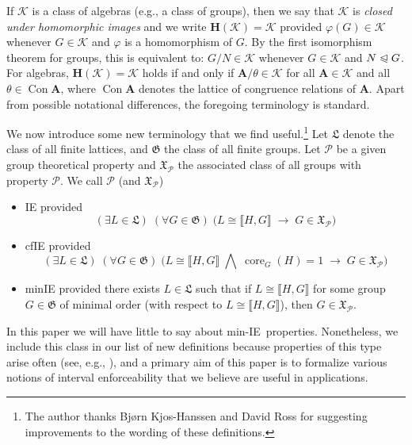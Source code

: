 \documentclass{gen-j-l}
\newcommand{\lb}{\ensuremath{\llbracket}}
\newcommand{\rb}{\ensuremath{\rrbracket}}
\newcommand{\<}{\ensuremath{\langle}}
\renewcommand{\>}{\ensuremath{\rangle}}
\theoremstyle{plain}
\theoremstyle{definition}
\theoremstyle{remark}
\numberwithin{theorem}{section}
\numberwithin{claim}{section}
\numberwithin{equation}{section}
\numberwithin{conjecture}{section}
\newcommand{\subnormal}{\ensuremath{\trianglelefteqslant}}
\newcommand{\Meet}{\ensuremath{\bigwedge}}
\newcommand{\Con}{\ensuremath{\operatorname{Con}}}
\newcommand{\core}{\ensuremath{\operatorname{core}}}
\newcommand{\2}{\ensuremath{\mathbf{2}}}
\newcommand{\3}{\ensuremath{\mathbf{3}}}
\newcommand{\bA}{\ensuremath{\mathbf{A}}}
\newcommand{\sG}{\ensuremath{\mathfrak{X}}}
\newcommand{\G}{\ensuremath{\mathfrak{G}}}
\newcommand{\bH}{\ensuremath{\mathbf{H}}}
\newcommand{\sK}{\ensuremath{\mathscr{K}}}
\newcommand{\fL}{\ensuremath{\mathfrak{L}}}
\newcommand{\cP}{\ensuremath{\mathcal{P}}}
\newcommand{\IE}{{\small IE}}
\renewcommand{\phi}{\ensuremath{\varphi}}
\begin{document}
If $\sK$ is a class of algebras (e.g., a class of groups), then we say that
$\sK$ is \emph{closed under homomorphic images} and we write $\bH(\sK) = \sK$
provided $\phi(G)\in \sK$ whenever $G\in \sK$ and $\phi$ is a homomorphism of
$G$. By the first isomorphism theorem for
  groups, this is equivalent to: 
$G/N\in \sK$ whenever $G\in \sK$ and $N\subnormal G$.  For algebras, 
$\bH(\sK) = \sK$ holds if and only if $\bA/\theta \in \sK$ for all $\bA\in \sK$
  and all $\theta \in \Con\bA$, where $\Con\bA$ denotes the lattice of
  congruence relations of $\bA$. 
Apart from possible notational differences, the foregoing terminology is
standard.  

We now introduce some new terminology that we find
useful.\footnote{The author thanks Bj{\o}rn Kjos-Hanssen and David Ross for suggesting
  improvements to the wording of these definitions.}  Let $\fL$
denote the class of all finite lattices, and $\G$ the class of all 
finite groups. Let $\cP$ be a given group theoretical property and $\sG_\cP$
the associated class of all groups with property $\cP$.  
We call $\cP$ (and $\sG_\cP$)
\begin{itemize}
\item 
\acf{IE} provided
\[
(\exists L\in \fL)  \; (\forall G \in \G) \; \bigl(L\cong \lb H,G \rb \; \longrightarrow \; G
\in \sG_\cP\bigr)
\]
\item
\acf{cfIE} provided
\[
(\exists L\in \fL)  \; (\forall G\in \G) \; \bigl( L\cong \lb H,G \rb \; \Meet \; \core_G(H)=1
\; \longrightarrow \; G  \in \sG_\cP \bigr)
\]
\item 
\acf{minIE}
provided there exists $L\in \fL$ such that if $L\cong \lb H,G \rb$ for some
group $G\in \G$ of minimal order (with respect to $L\cong \lb H,G \rb$), then
$G \in \sG_\cP$.
\end{itemize}
In this paper we will have little to
say about min-\IE\ properties.  Nonetheless, we include this class in our list
of new definitions because properties of this type arise often (see, e.g.,
\cite{Lucchini:1994a}), and a primary aim of this paper is to formalize
various notions of interval enforceability that we believe are
useful in applications. 
\end{document}

